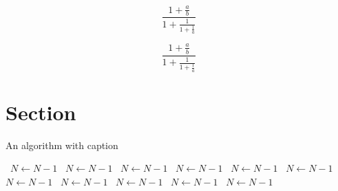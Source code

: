 \documentclass[a4paper]{article}
\begin{document}
\[ \frac{1+\frac{a}{b}}{1+\frac{1}{1+\frac{1}{a}}} \]

\[ \frac{1+\frac{a}{b}}{1+\frac{1}{1+\frac{1}{a}}} \]

\section{Section}

\begin{algorithm}
\caption{An algorithm with caption}
\begin{algorithmic}
\    \State $N \gets N - 1$
\    \State $N \gets N - 1$
\    \State $N \gets N - 1$
\    \State $N \gets N - 1$
\    \State $N \gets N - 1$
\    \State $N \gets N - 1$
\    \State $N \gets N - 1$
\    \State $N \gets N - 1$
\    \State $N \gets N - 1$
\    \State $N \gets N - 1$
\    \State $N \gets N - 1$
\EndWhile
\end{algorithmic}
\end{algorithm}
\end{document}
